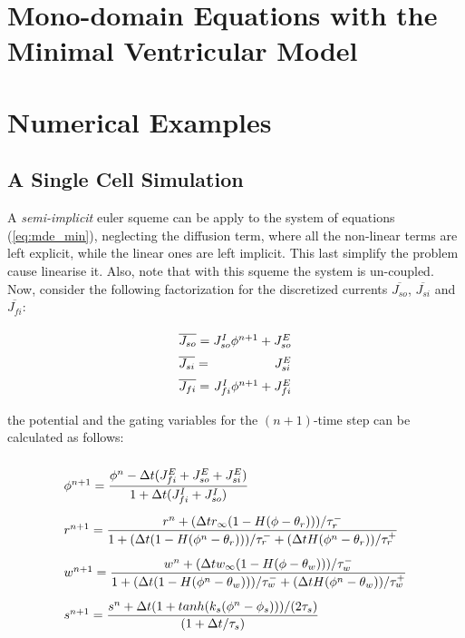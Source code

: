 \section{Mono-domain Equations with the Minimal Ventricular Model}

\newpage


\newpage
\section{Numerical Examples}


\subsection{A Single Cell Simulation}

A \textsl{semi-implicit} euler squeme can be apply to the system of equations (\ref{eq:mde_min}), neglecting the diffusion term, where all the non-linear terms are left explicit, while the linear ones are left implicit. This last simplify the problem cause linearise it. Also, note that with this squeme the system is un-coupled. Now, consider the following factorization for the discretized currents $\overline{J_{so}}$, $\overline{J_{si}}$ and $\overline{J_{fi}}$:

\begin{equation}
\arraycolsep=1.4pt\def\arraystretch{1.5}
\begin{array}{lr}
\overline{J_{so}} = & J_{so}^I \phi^{n+1} + J_{so}^E \\
\overline{J_{si}} = & J_{si}^E \\
\overline{J_{fi}} = & J_{fi}^I \phi^{n+1} + J_{fi}^E
\end{array} \label{eq:current_factorization}
\end{equation}

the potential and the gating variables for the $(n+1)$-time step can be calculated as follows:

\begin{equation}
\arraycolsep=1.4pt\def\arraystretch{2.8}
\begin{array}{l}
\phi^{n + 1} =  \dfrac{\phi^n - \Delta t (J_{fi}^E + J_{so}^E + J_{si}^E)}{1 + \Delta t (J_{fi}^I + J_{so}^I)} \\ 

r^{n+1} = \dfrac{r^n + (\Delta t r_{\infty}(1 - H(\phi - \theta_r)))/\tau_r^-}{1  +  (\Delta t (1 - H(\phi^n - \theta_r)))/\tau_r^- + (\Delta t H(\phi^n - \theta_r))/\tau_r^+} \\

w^{n+1} = \dfrac{w^n + (\Delta t w_{\infty}(1 - H(\phi - \theta_w)))/\tau_w^-}{1  +  (\Delta t (1 - H(\phi^n - \theta_w)))/\tau_w^- + (\Delta t H(\phi^n - \theta_w))/\tau_w^+} \\
   
s^{n+1} = \dfrac{s^n + \Delta t (1 + tanh(k_s (\phi^n - \phi_s)))/(2 \tau_s)}{(1 + \Delta t / \tau_s)}
\end{array} \label{eq:mde_min_imp}
\end{equation}

